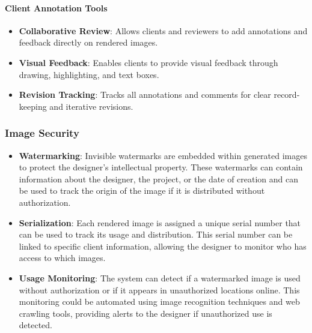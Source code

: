 \documentclass[12pt]{article}
\begin{document}
\paragraph{Client Annotation Tools}

\begin{itemize}
    \item \textbf{Collaborative Review}: Allows clients and reviewers to add annotations and feedback directly on rendered images.
    \item \textbf{Visual Feedback}: Enables clients to provide visual feedback through drawing, highlighting, and text boxes.
    \item \textbf{Revision Tracking}: Tracks all annotations and comments for clear record-keeping and iterative revisions.
\end{itemize}


\subsubsection{Image Security}
\begin{itemize}
\item \textbf{Watermarking}: Invisible watermarks are embedded within generated images to protect the designer's intellectual property. These watermarks can contain information about the designer, the project, or the date of creation and can be used to track the origin of the image if it is distributed without authorization.
\item \textbf{Serialization}: Each rendered image is assigned a unique serial number that can be used to track its usage and distribution. This serial number can be linked to specific client information, allowing the designer to monitor who has access to which images.
\item \textbf{Usage Monitoring}: The system can detect if a watermarked image is used without authorization or if it appears in unauthorized locations online. This monitoring could be automated using image recognition techniques and web crawling tools, providing alerts to the designer if unauthorized use is detected.
\end{itemize}
\end{document}
